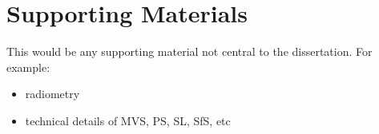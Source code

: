 \chapter{Supporting Materials}

This would be any supporting material not central to the dissertation.
For example:
\begin{itemize}
\item radiometry
\item technical details of MVS, PS, SL, SfS, etc
\end{itemize}
